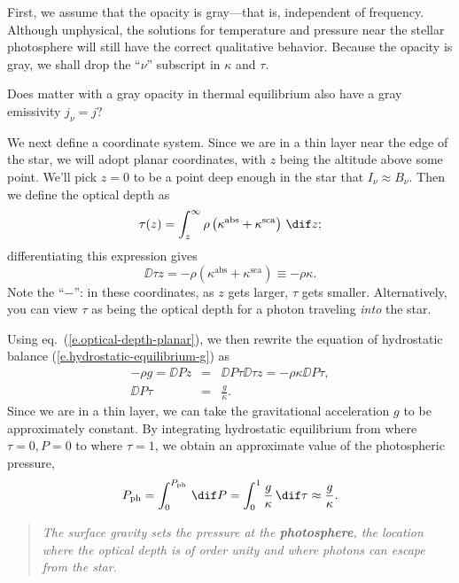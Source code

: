 First, we assume that the opacity is gray---that is, independent of frequency. Although unphysical, the solutions for temperature and pressure near the stellar photosphere will still have the correct qualitative behavior. Because the opacity is gray, we shall drop the ``$\nu$'' subscript in $\kappa$ and $\tau$.

\begin{exercisebox}
Does matter with a gray opacity in thermal equilibrium also have a gray emissivity $j_{\nu}=j$?
\end{exercisebox}

We next define a coordinate system. Since we are in a thin layer near the edge of the star, we will adopt planar coordinates, with $z$ being the altitude above some point. We'll pick $z=0$ to be a point deep enough in the star that $I_{\nu}\approx B_{\nu}$. Then we define the optical depth as
\begin{equation}\label{e.optical-depth-planar}
	\tau(z) = \int_{z}^{\infty} \rho\left(\kappa^{\mathrm{abs}}+\kappa^{\mathrm{sca}}\right)\,\dif z ;
\end{equation}
differentiating this expression gives
\[
	\DD{\tau}{z} = -\rho\left(\kappa^{\mathrm{abs}}+\kappa^{\mathrm{sca}}\right) \equiv -\rho\kappa.
\]
Note the ``$-$'': in these coordinates, as $z$ gets larger, $\tau$ gets smaller. Alternatively, you can view $\tau$ as being the optical depth for a photon traveling \emph{into} the star.

Using eq.~(\ref{e.optical-depth-planar}), we then rewrite the equation of hydrostatic balance (\ref{e.hydrostatic-equilibrium-g}) as
\begin{eqnarray}
	-\rho g = \DD{P}{z} &=& \DD{P}{\tau}\DD{\tau}{z} = -\rho\kappa\DD{P}{\tau},\nonumber\\
	\DD{P}{\tau} &=& \frac{g}{\kappa}.
\label{e.P-tau}
\end{eqnarray}
Since we are in a thin layer, we can take the gravitational acceleration $g$ to be approximately constant. By integrating hydrostatic equilibrium from where $\tau = 0, P = 0$ to where $\tau = 1$, we obtain an approximate value of the photospheric pressure,
\[
	P_{\mathrm{ph}} = \int_{0}^{P_{\mathrm{ph}}}\,\dif P = \int_{0}^{1}\frac{g}{\kappa}\,\dif\tau \approx \frac{g}{\kappa}.
\]
\begin{quote}
\emph{The surface gravity sets the pressure at the \textbf{photosphere}, the location where the optical depth is of order unity and where photons can escape from the star.}
\end{quote}

